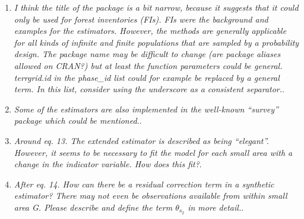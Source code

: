 \documentclass{article}
\begin{document}
\begin{enumerate}

\item \textit{I think the title of the package is a bit narrow, because it suggests that it could only be used for forest inventories (FIs). FIs were the background and examples for the estimators. However, the methods are generally applicable for all kinds of infinite and finite populations that are sampled by a probability design. The package name may be difficult to change (are package aliases allowed on CRAN?) but at least the function parameters could be general. terrgrid.id in the phase\_id list could for example be replaced by a general term. In this list, consider using the underscore as a consistent separator.}.


\item \textit{Some of the estimators are also implemented in the well-known “survey” package which could be mentioned.}.


\item \textit{Around eq. 13. The extended estimator is described as being “elegant”. However, it seems to be necessary to fit the model for each small area with a change in the indicator variable. How does this fit?}.


\item \textit{After eq. 14. How can there be a residual correction term in a synthetic estimator? There may not even be observations available from within small area G. Please describe and define the term $\theta_{s_2}$ in more detail.}.


\end{enumerate}
\end{document}
